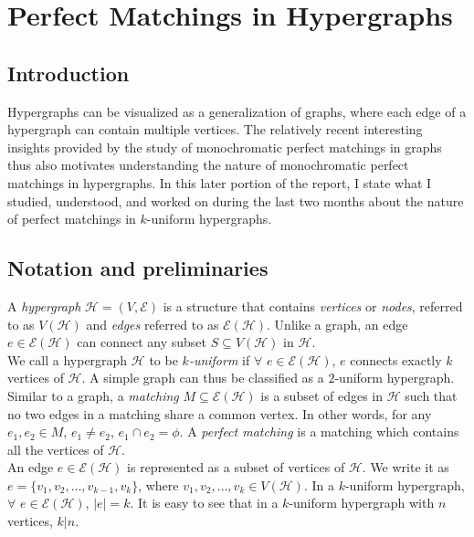 \documentclass[11pt]{article}
\begin{document}
\section{Perfect Matchings in Hypergraphs}
\subsection*{Introduction}
Hypergraphs can be visualized as a generalization of graphs, where each edge of a hypergraph can contain multiple vertices. The relatively recent interesting insights provided by the study of monochromatic perfect matchings in graphs thus also motivates understanding the nature of monochromatic perfect matchings in hypergraphs. In this later portion of the report, I state what I studied, understood, and worked on during the last two months about the nature of perfect matchings in $k$-uniform hypergraphs.

\subsection*{Notation and preliminaries}
A \textit{hypergraph} $\mathcal{H}=(V,\mathcal{E})$ is a structure that contains \textit{vertices} or \textit{nodes}, referred to as $V(\mathcal{H})$ and \textit{edges} referred to as $\mathcal{E}(\mathcal{H})$. Unlike a graph, an edge $e \in \mathcal{E}(\mathcal{H})$ can connect any subset $S \subseteq V(\mathcal{H})$ in $\mathcal{H}$.\\
We call a hypergraph $\mathcal{H}$ to be \textit{$k$-uniform} if $\forall$ $e \in \mathcal{E}(\mathcal{H})$, $e$ connects exactly $k$ vertices of $\mathcal{H}$. A simple graph can thus be classified as a $2$-uniform hypergraph.\\
Similar to a graph, a \textit{matching} $M \subseteq \mathcal{E}(\mathcal{H})$ is a subset of edges in $\mathcal{H}$ such that no two edges in a matching share a common vertex. In other words, for any $e_1,e_2 \in M$, $e_1 \ne e_2$, $e_1 \cap e_2=\phi$. A \textit{perfect matching} is a matching which contains all the vertices of $\mathcal{H}$.\\
An edge $e \in \mathcal{E}(\mathcal{H})$ is represented as a subset of vertices of $\mathcal{H}$. We write it as $e=\{v_1,v_2,\dots,v_{k-1},v_k\}$, where $v_1,v_2,\dots,v_k \in V(\mathcal{H})$. In a $k$-uniform hypergraph, $\forall$ $e \in \mathcal{E}(\mathcal{H})$, $|e|=k$. It is easy to see that in a $k$-uniform hypergraph with $n$ vertices, $k | n$.
\end{document}
